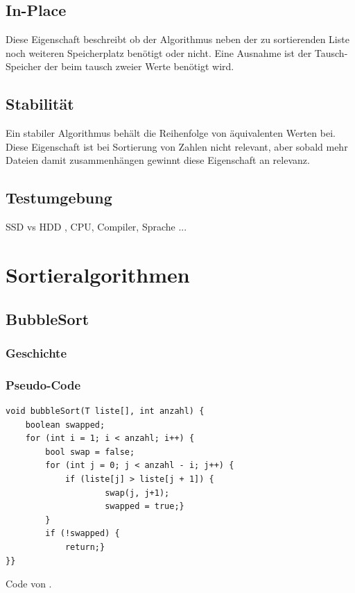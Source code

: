 \documentclass{article}
\begin{document}
\subsection{In-Place}
Diese Eigenschaft beschreibt ob der Algorithmus neben der zu sortierenden Liste noch weiteren Speicherplatz benötigt oder nicht. Eine Ausnahme ist der Tausch-Speicher der beim tausch zweier Werte benötigt wird. \cite{in-place}
\subsection{Stabilität}
Ein stabiler Algorithmus behält die Reihenfolge von äquivalenten Werten bei. Diese Eigenschaft ist bei Sortierung von Zahlen nicht relevant, aber sobald mehr Dateien damit zusammenhängen gewinnt diese Eigenschaft an relevanz. \cite{stability}
\subsection{Testumgebung}
SSD vs HDD , CPU, Compiler, Sprache ...


\section{Sortieralgorithmen}


\subsection{BubbleSort}
\subsubsection{Geschichte}
\subsubsection{Pseudo-Code}
\begin{lstlisting}
void bubbleSort(T liste[], int anzahl) {
    boolean swapped;
    for (int i = 1; i < anzahl; i++) {
        bool swap = false;
        for (int j = 0; j < anzahl - i; j++) { 
            if (liste[j] > liste[j + 1]) {
                	swap(j, j+1);
                	swapped = true;}
        }
        if (!swapped) {
            return;}
}}
\end{lstlisting} 
Code von \cite{bubbleSortCode}.
\end{document}
